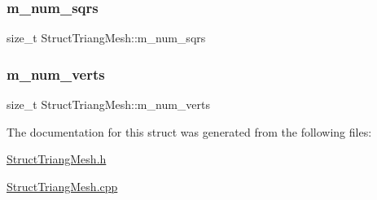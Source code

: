\subsubsection{\texorpdfstring{m\+\_\+num\+\_\+sqrs}{m\_num\_sqrs}}
{\footnotesize\ttfamily size\+\_\+t Struct\+Triang\+Mesh\+::m\+\_\+num\+\_\+sqrs\hspace{0.3cm}{\ttfamily [private]}}

\mbox{\label{structStructTriangMesh_a737630cba79f3c0b1aca424f7ec55a6c}} 
\subsubsection{\texorpdfstring{m\+\_\+num\+\_\+verts}{m\_num\_verts}}
{\footnotesize\ttfamily size\+\_\+t Struct\+Triang\+Mesh\+::m\+\_\+num\+\_\+verts\hspace{0.3cm}{\ttfamily [private]}}



The documentation for this struct was generated from the following files\+:\begin{DoxyCompactItemize}
\item 
\hyperlink{StructTriangMesh_8h}{Struct\+Triang\+Mesh.\+h}\item 
\hyperlink{StructTriangMesh_8cpp}{Struct\+Triang\+Mesh.\+cpp}\end{DoxyCompactItemize}
